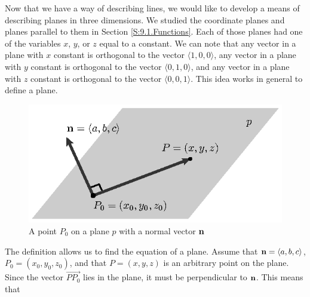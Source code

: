 Now that we have a way of describing lines, we would like to develop a means of describing planes in three dimensions.  We studied the coordinate planes and planes parallel to them in Section \ref{S:9.1.Functions}. Each of those planes had one of the variables $x$, $y$, or $z$ equal to a constant. We can note that any vector in a plane with $x$ constant is orthogonal to the vector $\langle 1,0,0 \rangle$, any vector in a plane with $y$ constant is orthogonal to the vector $\langle 0,1,0 \rangle$, and any vector in a plane with $z$ constant is orthogonal to the vector $\langle 0,0,1 \rangle$.  This idea works in general to define a plane. 

\vspace*{5pt}
\nin {} \vspace*{5pt} 

\begin{figure}[ht]
  \begin{center}
    \includegraphics{figures/fig_9_5_plane_normal.eps}
    \caption{A point $P_0$ on a plane $p$ with a normal vector $\mathbf{n}$}
    \label{F:9.5.plane.normal}
  \end{center}
\end{figure}

The definition allows us to find the equation of a plane. Assume that $\mathbf{n}=\langle a,b,c\rangle$, $P_0 =
(x_0, y_0, z_0)$, and that $P=(x,y,z)$ is an arbitrary point on the plane.
Since the vector $\overrightarrow{PP_0}$ lies in
the plane, it must be perpendicular to $\mathbf{n}$.  This means that

